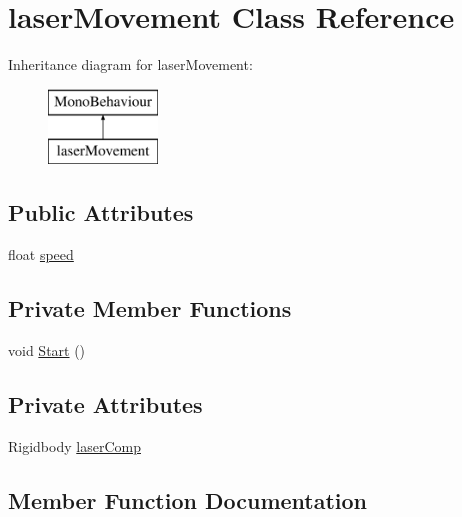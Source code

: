 \hypertarget{classlaser_movement}{}\section{laser\+Movement Class Reference}
\label{classlaser_movement}
Inheritance diagram for laser\+Movement\+:\begin{figure}[H]
\begin{center}
\leavevmode
\includegraphics[height=2.000000cm]{classlaser_movement}
\end{center}
\end{figure}
\subsection*{Public Attributes}
\begin{DoxyCompactItemize}
\item 
float \mbox{\hyperlink{classlaser_movement_a970c3ffad1f10386b83d4f54dcebc21d}{speed}}
\end{DoxyCompactItemize}
\subsection*{Private Member Functions}
\begin{DoxyCompactItemize}
\item 
void \mbox{\hyperlink{classlaser_movement_aaa5cabcbfc82ac37257730af9b842f7f}{Start}} ()
\end{DoxyCompactItemize}
\subsection*{Private Attributes}
\begin{DoxyCompactItemize}
\item 
Rigidbody \mbox{\hyperlink{classlaser_movement_ae7c67c229eb3081c017be2f359db80e3}{laser\+Comp}}
\end{DoxyCompactItemize}


\subsection{Member Function Documentation}
\mbox{\label{classlaser_movement_aaa5cabcbfc82ac37257730af9b842f7f}} 
